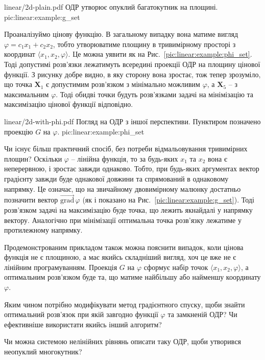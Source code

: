 \documentclass[\main/book.tex]{subfiles}
\begin{document}
\illustration
 {linear/2d-plain.pdf}
 {ОДР утворює опуклий багатокутник на площині.}
 {pic:linear:example:g_set}

Проаналізуймо цінову функцію. В загальному випадку вона матиме вигляд $\varphi = c_1 x_1 + c_2 x_2$, тобто утворюватиме площину в тривимірному просторі з координат $\langle x_1, x_2, \varphi \rangle$. Це можна уявити як на Рис.~\ref{pic:linear:example:phi_set}. Тоді допустимі розв'язки лежатимуть всередині проекції ОДР на площину цінової функції. З рисунку добре видно, в яку сторону вона зростає, тож тепер зрозуміло, що точка $\mathbf{X}_1$ є допустимим розв'язком з мінімально можливим $\varphi$, а $\mathbf{X}_5$ -- з максимальним $\varphi$. Тоді обидві точки будуть розв'язками задачі на мінімізацію та максимізацію цінової функції відповідно.

\illustration
 {linear/2d-with-phi.pdf}
 {Погляд на ОДР з іншої перспективи. Пунктиром позначено проекцію $G$ на $\varphi$.}
 {pic:linear:example:phi_set}

Чи існує більш практичний спосіб, без потреби відмальовування тривимірних площин? Оскільки $\varphi$ -- лінійна функція, то за будь-яких $x_1$ та $x_2$ вона є неперервною, і зростає завжди однаково. Тобто, при будь-яких аргументах вектор градієнту завжди буде однакової довжини та спрямований в однаковому напрямку. Це означає, що на звичайному двовимірному малюнку достатньо позначити вектор $\overrightarrow{\mathrm{grad}}\,\varphi$ (як і показано на Рис.~\ref{pic:linear:example:g_set}). Тоді розв'язком задачі на максимізацію буде точка, що лежить якнайдалі у напрямку вектору. Аналогічно при мінімізації оптимальна точка розв'язку лежатиме у протилежному напрямку.

\begin{note}
 Продемонстрованим прикладом також можна пояснити випадок, коли цінова функція не є площиною, а має якийсь складніший вигляд, хоч це вже не є лінійним програмуванням. Проекція $G$ на $\varphi$ сформує набір точок $\langle x_1, x_2, \varphi \rangle$, а оптимальним розв'язком буде та, що матиме найбільшу або найменшу координату $\varphi$.
\end{note}

\begin{question}
 Яким чином потрібно модифікувати метод градієнтного спуску, щоби знайти оптимальний розв'язок при якій завгодно функції $\varphi$ та замкненій ОДР? Чи ефективніше використати якийсь інший алгоритм?
\end{question}

\begin{question}
 Чи можна системою нелінійних рівнянь описати таку ОДР, щоби утворився неопуклий многокутник?
\end{question}
\end{document}
